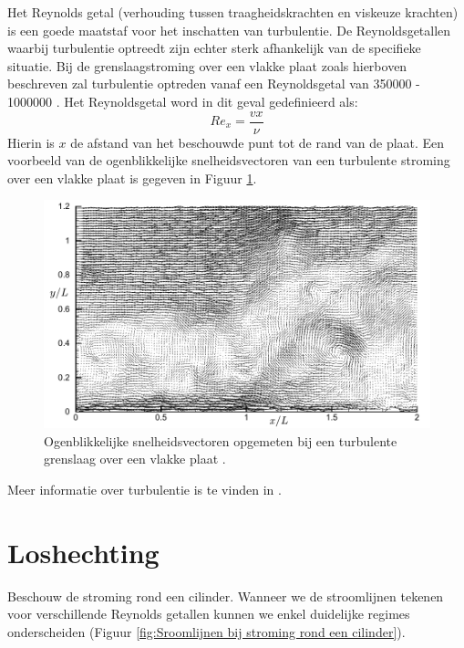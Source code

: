 Het Reynolds getal (verhouding tussen traagheidskrachten en viskeuze krachten) is een goede maatstaf voor het inschatten van turbulentie. De Reynoldsgetallen waarbij turbulentie optreedt zijn echter sterk afhankelijk van de specifieke situatie. Bij de grenslaagstroming over een vlakke plaat zoals hierboven beschreven zal turbulentie optreden vanaf een Reynoldsgetal van 350000 - 1000000 \cite{Schlichting1979}. Het Reynoldsgetal word in dit geval gedefinieerd als:
\begin{equation}
	Re_x = \frac{v x}{\nu}
\end{equation}
Hierin is $x$ de afstand van het beschouwde punt tot de rand van de plaat. Een voorbeeld van de ogenblikkelijke snelheidsvectoren van een turbulente stroming over een vlakke plaat is gegeven in Figuur \ref{fig:Turbulente grenslaag voorbeeld}.
\begin{figure}[htb]
	\centering
	\includegraphics[width=15cm]{fig/uitwendige_stroming/Turbulente_grenslaag_voorbeeld}
	\caption{Ogenblikkelijke snelheidsvectoren opgemeten bij een turbulente grenslaag over een vlakke plaat \cite{Tomkins1997}.}
	\label{fig:Turbulente grenslaag voorbeeld}
\end{figure}

Meer informatie over turbulentie is te vinden in \cite{McDonough2007}.

	\section{Loshechting}
	\label{sec:Loshechting}
	
Beschouw de stroming rond een cilinder. Wanneer we de stroomlijnen tekenen voor verschillende Reynolds getallen kunnen we enkel duidelijke regimes onderscheiden (Figuur \ref{fig:Sroomlijnen bij stroming rond een cilinder}).

